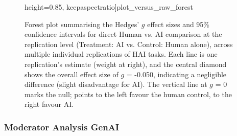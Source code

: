 \documentclass[manuscript, screen, review, acmsmall, anonymous]{acmart}
\begin{document}
\begin{figure}[H]
                 height=0.85\textheight,
                 keepaspectratio]{plot_versus_raw_forest}
  \caption{Forest plot summarising the Hedges’ $g$ effect sizes and 95\% confidence intervals for direct Human vs. AI comparison at the replication level (Treatment: AI vs. Control: Human alone), across multiple individual replications of HAI tasks. Each line is one replication’s estimate (weight at right), and the central diamond shows the overall effect size of $g$ = -0.050, indicating a negligible difference (slight disadvantage for AI). The vertical line at $g$ = 0 marks the null; points to the left favour the human control, to the right favour AI.}
  \label{fig:versus_raw_forest}
\end{figure}
\newpage
\subsubsection{Moderator Analysis GenAI}
\label{sec:CreativePerformanceComparisonOfHumanAndAI_Moderator_GenAI}
\end{document}
